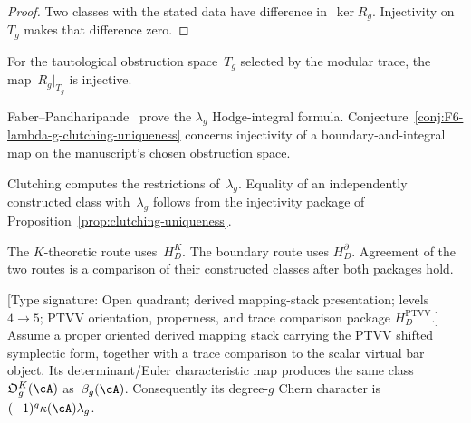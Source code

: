 \begin{proof}
Two classes with the stated data have difference in~$\ker R_g$.
Injectivity on~$T_g$ makes that difference zero.
\end{proof}

\begin{conjecture}
\label{conj:F6-lambda-g-clutching-uniqueness}
For the tautological obstruction space~$T_g$ selected by the modular
trace, the map~$R_g|_{T_g}$ is injective.
\end{conjecture}

\begin{remark}
\label{rem:F6-status}
Faber--Pandharipande~\cite{FP03} prove the $\lambda_g$ Hodge-integral
formula.  Conjecture~\ref{conj:F6-lambda-g-clutching-uniqueness}
concerns injectivity of a boundary-and-integral map on the manuscript's
chosen obstruction space.
\end{remark}

\begin{remark}
\label{rem:clutching-uniqueness-scope}
Clutching computes the restrictions of~$\lambda_g$.  Equality of an
independently constructed class with~$\lambda_g$ follows from the
injectivity package of Proposition~\ref{prop:clutching-uniqueness}.
\end{remark}

\begin{remark}
\label{rem:clutching-uniqueness-role}
The $K$-theoretic route uses~$H_D^K$.  The boundary route uses
$H_D^{\partial}$.  Agreement of the two routes is a comparison of
their constructed classes after both packages hold.
\end{remark}

\begin{proposition}
\label{prop:theorem-D-factorization-homology-alt}
\textup{[Type signature: Open quadrant; derived mapping-stack
presentation; levels $4\to5$; PTVV orientation, properness, and trace
comparison package $H_D^{\mathrm{PTVV}}$.]}
Assume a proper oriented derived mapping stack carrying the PTVV
shifted symplectic form, together with a trace comparison to the
scalar virtual bar object.  Its determinant/Euler characteristic map
produces the same class~$\mathfrak O_g^K(\cA)$ as~$\beta_g(\cA)$.
Consequently its degree-$g$ Chern character is
$(-1)^g\kappa(\cA)\lambda_g$.
\end{proposition}

